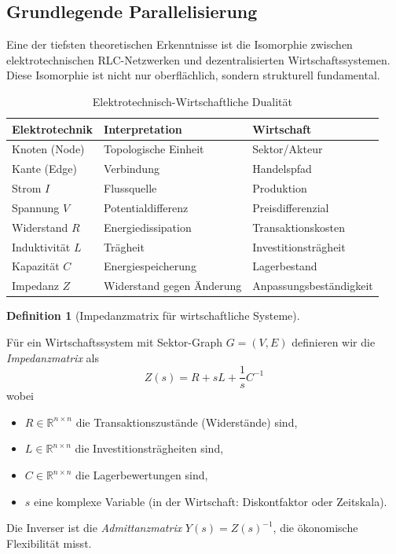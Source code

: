 \documentclass[a4paper,12pt]{article}
\theoremstyle{definition}
\newtheorem{definition}{Definition}
\begin{document}
\subsection{Grundlegende Parallelisierung}

Eine der tiefsten theoretischen Erkenntnisse ist die Isomorphie zwischen elektrotechnischen RLC-Netzwerken und dezentralisierten Wirtschaftssystemen. Diese Isomorphie ist nicht nur oberflächlich, sondern strukturell fundamental.

\begin{table}[h]
\centering
\renewcommand{\arraystretch}{1.5}
\begin{tabular}{|l|l|l|}
\hline
\textbf{Elektrotechnik} & \textbf{Interpretation} & \textbf{Wirtschaft} \\
\hline
Knoten (Node) & Topologische Einheit & Sektor/Akteur \\
Kante (Edge) & Verbindung & Handelspfad \\
Strom $I$ & Flussquelle & Produktion \\
Spannung $V$ & Potentialdifferenz & Preisdifferenzial \\
Widerstand $R$ & Energiedissipation & Transaktionskosten \\
Induktivität $L$ & Trägheit & Investitionsträgheit \\
Kapazität $C$ & Energiespeicherung & Lagerbestand \\
Impedanz $Z$ & Widerstand gegen Änderung & Anpassungsbeständigkeit \\
\hline
\end{tabular}
\caption{Elektrotechnisch-Wirtschaftliche Dualität}
\label{tab:dualitaet}
\end{table}

\begin{definition}[Impedanzmatrix für wirtschaftliche Systeme]
\label{def:impedanz_wirtschaft}

Für ein Wirtschaftssystem mit Sektor-Graph $G = (V, E)$ definieren wir die \emph{Impedanzmatrix} als
\[
Z(s) = R + s L + \frac{1}{s} C^{-1}
\]
wobei
\begin{itemize}
\item $R \in \mathbb{R}^{n \times n}$ die Transaktionszustände (Widerstände) sind,
\item $L \in \mathbb{R}^{n \times n}$ die Investitionsträgheiten sind,
\item $C \in \mathbb{R}^{n \times n}$ die Lagerbewertungen sind,
\item $s$ eine komplexe Variable (in der Wirtschaft: Diskontfaktor oder Zeitskala).
\end{itemize}

Die Inverser ist die \emph{Admittanzmatrix} $Y(s) = Z(s)^{-1}$, die ökonomische Flexibilität misst.
\end{definition}
\end{document}
